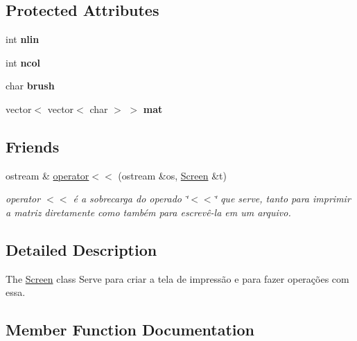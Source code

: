 \subsection*{Protected Attributes}
\begin{DoxyCompactItemize}
\item 
int {\bfseries nlin}\hypertarget{classScreen_a5b5eccb332ec4d5a5610283ef29a5164}{}\label{classScreen_a5b5eccb332ec4d5a5610283ef29a5164}

\item 
int {\bfseries ncol}\hypertarget{classScreen_a5973f5b14ee8dcf5f082fa66ceb23a5e}{}\label{classScreen_a5973f5b14ee8dcf5f082fa66ceb23a5e}

\item 
char {\bfseries brush}\hypertarget{classScreen_aa20056bc34de1832f8024764ac9c0e82}{}\label{classScreen_aa20056bc34de1832f8024764ac9c0e82}

\item 
vector$<$ vector$<$ char $>$ $>$ {\bfseries mat}\hypertarget{classScreen_a25e00af60d7e87b9b31cacb050c602d3}{}\label{classScreen_a25e00af60d7e87b9b31cacb050c602d3}

\end{DoxyCompactItemize}
\subsection*{Friends}
\begin{DoxyCompactItemize}
\item 
ostream \& \hyperlink{classScreen_aab6a2880746bfe1b7964817cc8f0989e}{operator$<$$<$} (ostream \&os, \hyperlink{classScreen}{Screen} \&t)
\begin{DoxyCompactList}\small\item\em operator $<$$<$ é a sobrecarga do operado \char`\"{}$<$$<$\char`\"{} que serve, tanto para imprimir a matriz diretamente como também para escrevê-\/la em um arquivo. \end{DoxyCompactList}\end{DoxyCompactItemize}


\subsection{Detailed Description}
The \hyperlink{classScreen}{Screen} class Serve para criar a tela de impressão e para fazer operações com essa. 

\subsection{Member Function Documentation}
